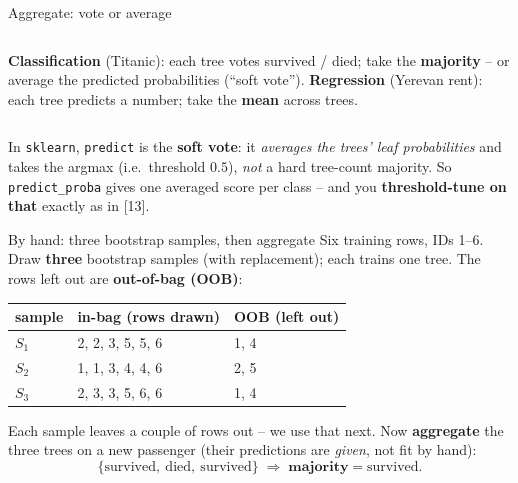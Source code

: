\documentclass[aspectratio=169]{beamer}
\begin{document}
\begin{frame}{Aggregate: vote or average}
  \begin{columns}[T]
    \textbf{Classification} (Titanic): each tree votes survived / died; take the
    \textbf{majority} -- or average the predicted probabilities (``soft vote'').
    \textbf{Regression} (Yerevan rent): each tree predicts a number; take the
    \textbf{mean} across trees.
  \end{columns}
  \vfill
  \begin{center}
  \end{center}
  \vfill
  \vskip 4pt
  {\footnotesize In \texttt{sklearn}, \texttt{predict} is the \textbf{soft vote}: it
  \emph{averages the trees' leaf probabilities} and takes the argmax (i.e.\ threshold $0.5$),
  \emph{not} a hard tree-count majority. So \texttt{predict\_proba} gives one averaged score
  per class -- and you \textbf{threshold-tune on that} exactly as in [13].}
\end{frame}

\begin{frame}{By hand: three bootstrap samples, then aggregate}
  Six training rows, IDs 1--6. Draw \textbf{three} bootstrap samples (with replacement);
  each trains one tree. The rows left out are \textbf{out-of-bag (OOB)}:
  \vskip 3pt
  \begin{center}\small
    \renewcommand{\arraystretch}{1.25}
    \begin{tabular}{l l l}
      sample & in-bag (rows drawn) & OOB (left out) \\
      \hline
      $S_1$ & 2, 2, 3, 5, 5, 6 & \textcolor{armred}{1, 4} \\
      $S_2$ & 1, 1, 3, 4, 4, 6 & \textcolor{armred}{2, 5} \\
      $S_3$ & 2, 3, 3, 5, 6, 6 & \textcolor{armred}{1, 4} \\
      \hline
    \end{tabular}
  \end{center}
  \vskip 4pt
  Each sample leaves a couple of rows out -- we use that next. Now \textbf{aggregate} the
  three trees on a new passenger (their predictions are \emph{given}, not fit by hand):
  \[
    \{\text{survived},\ \text{died},\ \text{survived}\}\;\Rightarrow\;\textbf{majority} = \text{survived}.
  \]
\end{frame}
\end{document}
